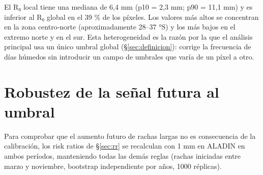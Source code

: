 El R₀ local tiene una mediana de 6,4 mm (p10 = 2,3 mm; p90 = 11,1 mm) y es inferior al R₀ global en el 39 \% de los píxeles. Los valores más altos se concentran en la zona centro-norte (aproximadamente 28--37 °S) y los más bajos en el extremo norte y en el sur. Esta heterogeneidad es la razón por la que el análisis principal usa un único umbral global (§\ref{sec:definicion}): corrige la frecuencia de días húmedos sin introducir un campo de umbrales que varía de un píxel a otro.

\section{Robustez de la señal futura al umbral}\label{sec:S4}

Para comprobar que el aumento futuro de rachas largas no es consecuencia de la calibración, los risk ratios de §\ref{sec:rr} se recalculan con 1 mm en ALADIN en ambos períodos, manteniendo todas las demás reglas (rachas iniciadas entre marzo y noviembre, bootstrap independiente por años, 1000 réplicas).

